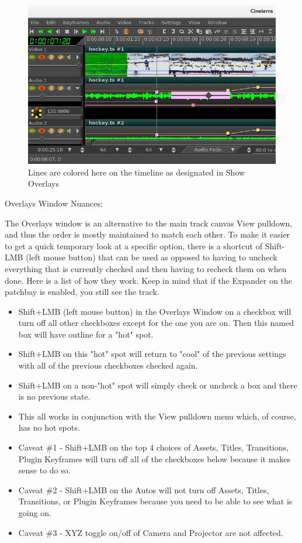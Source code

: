 \begin{figure}[htpb]
    \centering
    \includegraphics[width=0.8\linewidth]{images/overlays1.png}
    \caption{Lines are colored here on the timeline as designated in Show Overlays}
    \label{fig:overlays1}
\end{figure}

Overlays Window Nuances:

The Overlays window is an alternative to the main track canvas View pulldown, and thus the order is mostly maintained to match each other.  
To make it easier to get a quick temporary look at a specific option, there is a shortcut of Shift-LMB (left mouse button) that can be used as opposed to having to uncheck everything that is currently checked and then having to recheck them on when done.  
Here is a list of how they work.  Keep in mind that if the Expander on the patchbay is enabled, you still see the track.

\begin{itemize}
    \item  Shift+LMB (left mouse button) in the Overlays Window on a checkbox will turn off all other
        checkboxes except for the one you are on.  Then this named box will have outline for a  "hot" spot.
    \item  Shift+LMB on this "hot" spot will return to "cool" of the previous settings with all of the previous
        checkboxes checked again.
    \item  Shift+LMB on a non-"hot" spot will simply check or uncheck a box and there is no previous state.
    \item This all works in conjunction with the View pulldown menu which, of course, has no hot spots.
    \item  Caveat \#1 - Shift+LMB on the top 4 choices of Assets, Titles, Transitions, Plugin Keyframes will turn
        off all of the checkboxes below because it makes sense to do so.
    \item  Caveat \#2 - Shift+LMB on the Autos will not turn off Assets, Titles, Transitions, or Plugin Keyframes
        because you need to be able to see what is going on.
        \item Caveat \#3 - XYZ toggle on/off of Camera and Projector are not affected.
\end{itemize}

